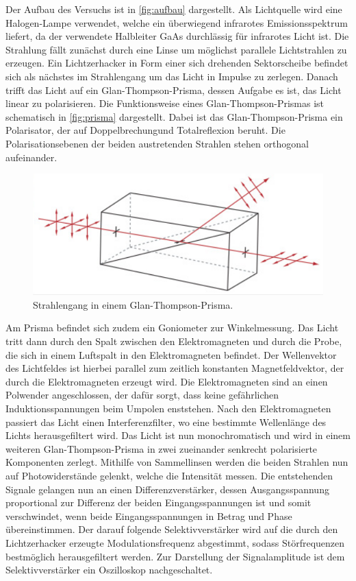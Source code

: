 Der Aufbau des Versuchs ist in \autoref{fig:aufbau} dargestellt.
Als Lichtquelle wird eine Halogen-Lampe verwendet, welche ein überwiegend infrarotes Emissionsspektrum liefert, da der verwendete Halbleiter
GaAs durchlässig für infrarotes Licht ist.
Die Strahlung fällt zunächst durch eine Linse um möglichst parallele Lichtstrahlen zu erzeugen.
Ein Lichtzerhacker in Form einer sich drehenden Sektorscheibe befindet sich als nächstes im Strahlengang um das Licht in Impulse zu zerlegen.
Danach trifft das Licht auf ein Glan-Thompson-Prisma, dessen Aufgabe es ist, das Licht linear zu polarisieren.
Die Funktionsweise eines Glan-Thompson-Prismas ist schematisch in \autoref{fig:prisma} dargestellt. Dabei ist das Glan-Thompson-Prisma ein Polarisator, der auf
Doppelbrechungund Totalreflexion beruht. Die Polarisationsebenen der beiden
austretenden Strahlen stehen orthogonal aufeinander.
\begin{figure}[H]
    \centering
    \includegraphics[scale=0.35]{Abbildungen/prisma.png}
    \caption{Strahlengang in einem Glan-Thompson-Prisma.\cite{Prisma}}
    \label{fig:prisma}
\end{figure}
Am Prisma befindet sich zudem ein Goniometer zur Winkelmessung.
Das Licht tritt dann durch den Spalt zwischen den Elektromagneten und durch die Probe, die sich in einem Luftspalt in den Elektromagneten
befindet.
Der Wellenvektor des Lichtfeldes ist hierbei parallel zum zeitlich konstanten Magnetfeldvektor, der durch die Elektromagneten erzeugt wird.
Die Elektromagneten sind an einen Polwender angeschlossen, der dafür sorgt, dass keine gefährlichen Induktionsspannungen beim Umpolen enststehen.
Nach den Elektromagneten passiert das Licht einen Interferenzfilter, wo eine bestimmte Wellenlänge des Lichts herausgefiltert wird.
Das Licht ist nun monochromatisch und wird in einem weiteren Glan-Thompson-Prisma in
zwei zueinander senkrecht polarisierte Komponenten zerlegt.
Mithilfe von Sammellinsen werden die beiden Strahlen nun auf Photowiderstände gelenkt, welche die Intensität messen.
Die entstehenden Signale gelangen nun an einen Differenzverstärker, dessen Ausgangsspannung proportional zur Differenz der beiden Eingangsspannungen
ist und somit verschwindet, wenn beide Eingangsspannungen in Betrag und Phase übereinstimmen.
Der darauf folgende Selektivverstärker wird auf die durch den Lichtzerhacker erzeugte
Modulationsfrequenz abgestimmt, sodass Störfrequenzen bestmöglich herausgefiltert werden.
Zur Darstellung der Signalamplitude ist dem Selektivverstärker ein Oszilloskop nachgeschaltet.

